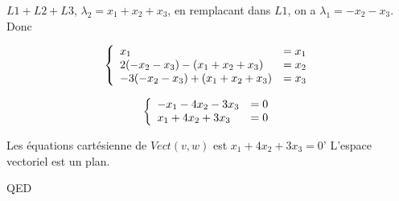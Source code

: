 \documentclass[]{book}
\theoremstyle{definition}
\begin{document}
$L1+L2+L3$, $\lambda_2 = x_1+x_2+x_3$, en remplacant dans $L1$, on a $\lambda_1 = -x_2 - x_3$. Donc

$$
\left\{ 
\begin{array}{l l}
x_1 & = x_1 \\
2(-x_2 - x_3) - (x_1 + x_2 + x_3) & = x_2 \\
-3(-x_2 - x_3) + (x_1 + x_2 + x_3) & = x_3 \\
\end{array}
\right. 
$$

$$
\left\{ 
\begin{array}{l l}
-x_1 - 4x_2 - 3x_3 & = 0 \\
x_1 + 4x_2 + 3x_3 & = 0 \\
\end{array}
\right. 
$$

Les \'equations cart\'esienne de $Vect(v,w)$ est $x_1 + 4x_2 + 3x_3 =0$' L'espace vectoriel est un plan.




QED
\end{document}
